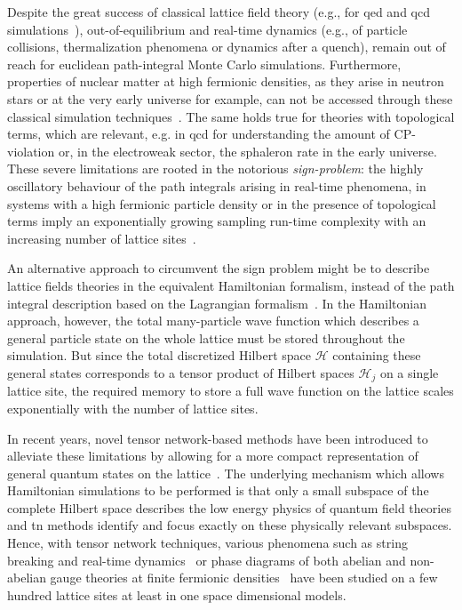 Despite the great success of classical lattice field theory (e.g., for \gls{qed} and \gls{qcd} simulations~\cite{Durr2008,Alexandrou2020}), out-of-equilibrium and real-time dynamics (e.g., of particle collisions, thermalization phenomena or dynamics after a quench), remain out of reach for euclidean path-integral Monte Carlo simulations. 
Furthermore, properties of nuclear matter at high fermionic densities, as they arise in neutron stars or at the very early universe  for example, can not be accessed through these classical simulation techniques~\cite{Fukushima2011}. The same holds true for theories with topological terms, which are relevant, e.g. in \gls{qcd} for understanding the amount of CP-violation or, in the electroweak sector, the sphaleron rate in the early universe.  
These severe limitations are rooted in the notorious \emph{sign-problem}: the highly oscillatory behaviour of the path integrals arising in real-time phenomena, in systems with a high fermionic particle density or in the presence of topological terms imply an exponentially growing sampling run-time complexity with an increasing number of lattice sites~\cite{Troyer2005}.

An alternative approach to circumvent the sign problem might be to describe lattice fields theories in the equivalent Hamiltonian formalism, instead of the path integral description based on the Lagrangian formalism~\cite{Kogut1975,Kogut1979}. 
In the Hamiltonian approach, however, the total many-particle wave function which describes a general particle state on the whole lattice must be stored throughout the simulation. 
But since the total discretized Hilbert space $\mathcal{H}$ containing these general states corresponds to a tensor product of Hilbert spaces $\mathcal{H}_j$ on a single lattice site, the required memory to store a full wave function on the lattice scales exponentially with the number of lattice sites.

In recent years, novel tensor network-based methods have been introduced to alleviate these limitations by allowing for a more compact representation of general quantum states on the lattice~\cite{Silvi2014,Dalmonte2016,Banuls2019SimulatingLG,Banuls2019,Banuls2020TNreview}. The underlying mechanism which allows Hamiltonian simulations to be performed is that only a small subspace of the complete Hilbert space describes the low energy physics of quantum field theories and \gls{tn} methods identify and focus exactly on these physically relevant subspaces. Hence, with tensor network techniques, various phenomena such as string breaking and real-time dynamics~\cite{Buyens2013,Kuehn2015,Pichler2016,Buyens2016b,Banuls2019b,Rigobello2021} or phase diagrams of both abelian and non-abelian gauge theories at finite fermionic densities~\cite{Banuls2016a,Silvi2017,Felser2019,Silvi2019} have been studied on a few hundred lattice sites at least in one space dimensional models. 

